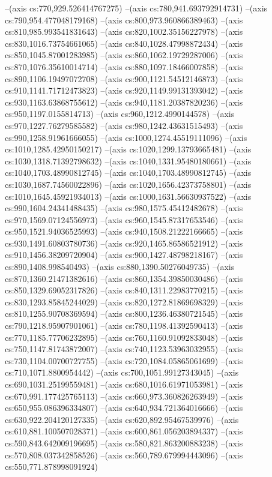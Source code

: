 --(axis cs:770,929.526414767275)
--(axis cs:780,941.693792914731)
--(axis cs:790,954.477048179168)
--(axis cs:800,973.960866389463)
--(axis cs:810,985.993541831643)
--(axis cs:820,1002.35156227978)
--(axis cs:830,1016.73754661065)
--(axis cs:840,1028.47998872434)
--(axis cs:850,1045.87001283985)
--(axis cs:860,1062.19729287006)
--(axis cs:870,1076.35610014714)
--(axis cs:880,1097.18466007858)
--(axis cs:890,1106.19497072708)
--(axis cs:900,1121.54512146873)
--(axis cs:910,1141.71712473823)
--(axis cs:920,1149.99131393042)
--(axis cs:930,1163.63868755612)
--(axis cs:940,1181.20387820236)
--(axis cs:950,1197.0155814713)
--(axis cs:960,1212.4990144578)
--(axis cs:970,1227.76279585582)
--(axis cs:980,1242.43631515493)
--(axis cs:990,1258.91961666055)
--(axis cs:1000,1274.45519111096)
--(axis cs:1010,1285.42950150217)
--(axis cs:1020,1299.13793665481)
--(axis cs:1030,1318.71392798632)
--(axis cs:1040,1331.95480180661)
--(axis cs:1040,1703.48990812745)
--(axis cs:1040,1703.48990812745)
--(axis cs:1030,1687.74560022896)
--(axis cs:1020,1656.42373758801)
--(axis cs:1010,1645.45921934013)
--(axis cs:1000,1631.56630937522)
--(axis cs:990,1604.24341488435)
--(axis cs:980,1575.45412482678)
--(axis cs:970,1569.07124556973)
--(axis cs:960,1545.87317653546)
--(axis cs:950,1521.94036525993)
--(axis cs:940,1508.21222166665)
--(axis cs:930,1491.60803780736)
--(axis cs:920,1465.86586521912)
--(axis cs:910,1456.38209720904)
--(axis cs:900,1427.48798218167)
--(axis cs:890,1408.998540493)
--(axis cs:880,1390.50276049735)
--(axis cs:870,1360.21471382616)
--(axis cs:860,1354.39850030486)
--(axis cs:850,1329.69052317826)
--(axis cs:840,1311.22983770215)
--(axis cs:830,1293.85845244029)
--(axis cs:820,1272.81869698329)
--(axis cs:810,1255.90708369594)
--(axis cs:800,1236.46380721545)
--(axis cs:790,1218.95907901061)
--(axis cs:780,1198.41392590413)
--(axis cs:770,1185.77706232895)
--(axis cs:760,1160.91092833048)
--(axis cs:750,1147.81743872007)
--(axis cs:740,1123.53963032955)
--(axis cs:730,1104.00700727755)
--(axis cs:720,1084.05865061699)
--(axis cs:710,1071.8800954442)
--(axis cs:700,1051.99127343045)
--(axis cs:690,1031.25199559481)
--(axis cs:680,1016.61971053981)
--(axis cs:670,991.177425765113)
--(axis cs:660,973.360826263949)
--(axis cs:650,955.086396334807)
--(axis cs:640,934.721364016666)
--(axis cs:630,922.204120127335)
--(axis cs:620,892.95467539976)
--(axis cs:610,881.100507028371)
--(axis cs:600,861.056203894337)
--(axis cs:590,843.642009196695)
--(axis cs:580,821.863200883238)
--(axis cs:570,808.037342858526)
--(axis cs:560,789.679994443096)
--(axis cs:550,771.878998091924)
